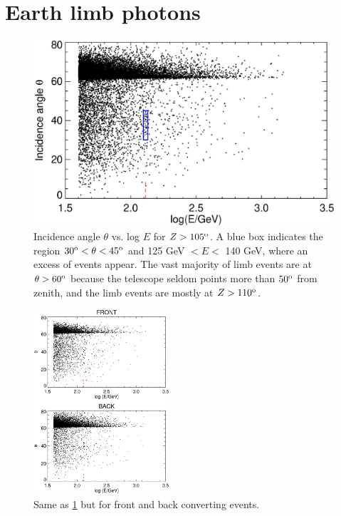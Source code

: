 \documentclass[aps,twocolumn,prd,superscriptaddress,showpacs,nofootinbib,fixfloat]{revtex4}
\newcommand{\degree}{^{\rm o}}
\begin{document}
\section{Earth limb photons}
\label{sec:EarthLimb}

\begin{figure}
  \centering
  \includegraphics[width=1.0\linewidth]{plots/theta-E.ps}
  \caption{Incidence angle $\theta$ vs. log $E$ for $Z >
  105\degree$.  A blue box indicates the region $30\degree <
  \theta < 45\degree$ and 125 GeV $< E <$ 140 GeV, where an
  excess of events appear.  The vast majority of limb events
  are at $\theta > 60\degree$ because the telescope seldom
  points more than $50\degree$ from zenith, and the limb
  events are mostly at $Z>110\degree$.}
  \label{fig:theta-E}
\end{figure}

\begin{figure}
  \centering
  \includegraphics[width=0.45\textwidth]{plots/theta-E-frontback.ps}
  \caption{Same as \ref{fig:theta-E} but for front and back
  converting events.}
  \label{fig:theta-E-frontback}
\end{figure}
\end{document}
